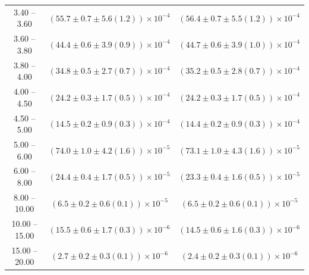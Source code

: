 \begin{table}
\begin{center}
\begin{tabular}{ c | c c }
3.40 -- 3.60 & $(55.7\pm0.7\pm5.6(1.2))\times10^{-4}$ & $(56.4\pm0.7\pm5.5(1.2))\times10^{-4}$ \\ 
3.60 -- 3.80 & $(44.4\pm0.6\pm3.9(0.9))\times10^{-4}$ & $(44.7\pm0.6\pm3.9(1.0))\times10^{-4}$ \\ 
3.80 -- 4.00 & $(34.8\pm0.5\pm2.7(0.7))\times10^{-4}$ & $(35.2\pm0.5\pm2.8(0.7))\times10^{-4}$ \\ 
4.00 -- 4.50 & $(24.2\pm0.3\pm1.7(0.5))\times10^{-4}$ & $(24.2\pm0.3\pm1.7(0.5))\times10^{-4}$ \\ 
4.50 -- 5.00 & $(14.5\pm0.2\pm0.9(0.3))\times10^{-4}$ & $(14.4\pm0.2\pm0.9(0.3))\times10^{-4}$ \\ 
5.00 -- 6.00 & $(74.0\pm1.0\pm4.2(1.6))\times10^{-5}$ & $(73.1\pm1.0\pm4.3(1.6))\times10^{-5}$ \\ 
6.00 -- 8.00 & $(24.4\pm0.4\pm1.7(0.5))\times10^{-5}$ & $(23.3\pm0.4\pm1.6(0.5))\times10^{-5}$ \\ 
8.00 -- 10.00 & $(6.5\pm0.2\pm0.6(0.1))\times10^{-5}$ & $(6.5\pm0.2\pm0.6(0.1))\times10^{-5}$ \\ 
10.00 -- 15.00 & $(15.5\pm0.6\pm1.7(0.3))\times10^{-6}$ & $(14.5\pm0.6\pm1.6(0.3))\times10^{-6}$ \\ 
15.00 -- 20.00 & $(2.7\pm0.2\pm0.3(0.1))\times10^{-6}$ & $(2.4\pm0.2\pm0.3(0.1))\times10^{-6}$ \\ 
\hline
\end{tabular}
\end{center}
\end{table}
 
